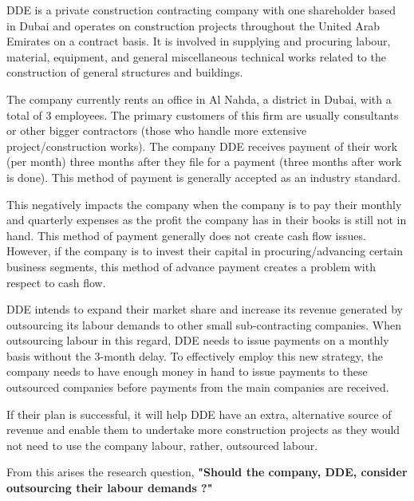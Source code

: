 {DDE is a private construction contracting company with one shareholder based in Dubai and operates on construction projects throughout the United Arab Emirates on a contract basis. It is involved in supplying and procuring labour, material, equipment, and general miscellaneous technical works related to the construction of general structures and buildings.}

{The company currently rents an office in Al Nahda, a district in Dubai, with a total of 3 employees. The primary customers of this firm are usually consultants or other bigger contractors (those who handle more extensive project/construction works). The company DDE receives payment of their work (per month) three months after they file for a payment (three months after work is done). This method of payment is generally accepted as an industry standard.}

{This negatively impacts the company when the company is to pay their monthly and quarterly expenses as the profit the company has in their books is still not in hand. This method of payment generally does not create cash flow issues. However, if the company is to invest their capital in procuring/advancing certain business segments, this method of advance payment creates a problem with respect to cash flow.}

{DDE intends to expand their market share and increase its revenue generated by outsourcing its labour demands to other small sub-contracting companies. When outsourcing labour in this regard, DDE needs to issue payments on a monthly basis without the 3-month delay. To effectively employ this new strategy, the company needs to have enough money in hand to issue payments to these outsourced companies before payments from the main companies are received.}

{If their plan is successful, it will help DDE have an extra, alternative source of revenue and enable them to undertake more construction projects as they would not need to use the company labour, rather, outsourced labour.}

{From this arises the research question, \textbf{"Should the company, DDE, consider outsourcing their labour demands ?"}}


